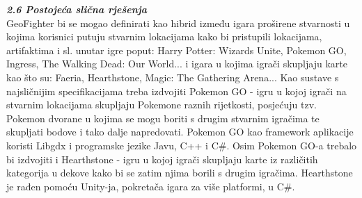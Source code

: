 		\textbf{\textit{\large 2.6 Postojeća slična rješenja}} \\
		
		{GeoFighter bi se mogao definirati kao hibrid između igara proširene stvarnosti u kojima korisnici putuju stvarnim lokacijama kako bi pristupili lokacijama, artifaktima i sl. unutar igre poput: Harry Potter: Wizards Unite, Pokemon GO, Ingress, The Walking Dead: Our World... i igara u kojima igrači skupljaju karte kao što su: Faeria, Hearthstone, Magic: The Gathering Arena... Kao sustave s najsličnijim specifikacijama treba izdvojiti Pokemon GO - igru u kojoj igrači na stvarnim lokacijama skupljaju Pokemone raznih rijetkosti, posjećuju tzv. Pokemon dvorane u kojima se mogu boriti s drugim stvarnim igračima te skupljati bodove i tako dalje napredovati. Pokemon GO kao framework aplikacije koristi Libgdx i programske jezike Javu, C++ i C\#. Osim Pokemon GO-a trebalo bi izdvojiti i Hearthstone - igru u kojoj igrači skupljaju karte iz različitih kategorija u dekove kako bi se zatim njima borili s drugim igračima. Hearthstone je rađen pomoću Unity-ja, pokretača igara za više platformi, u  C\#.  }
		\eject
	